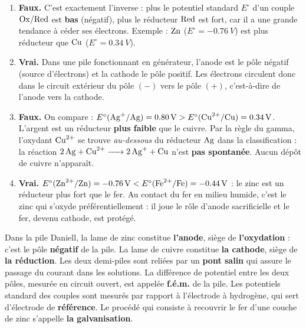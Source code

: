 \documentclass[11pt]{article}
\newcommand{\cle}[1]{{\popxbold\color{popdark}#1}}
\begin{document}
\begin{corrige}
\begin{enumerate}
\item \textbf{Faux.} C'est exactement l'inverse : plus le potentiel standard $E^\circ$ d'un couple $\ce{Ox}/\ce{Red}$ est \textbf{bas} (négatif), plus le réducteur $\ce{Red}$ est fort, car il a une grande tendance à céder ses électrons. Exemple : $\ce{Zn}$ ($E^\circ = \SI{-0,76}{V}$) est plus réducteur que $\ce{Cu}$ ($E^\circ = \SI{+0,34}{V}$).
\item \textbf{Vrai.} Dans une pile fonctionnant en générateur, l'anode est le pôle négatif (source d'électrons) et la cathode le pôle positif. Les électrons circulent donc dans le circuit extérieur du pôle $(-)$ vers le pôle $(+)$, c'est-à-dire de l'anode vers la cathode.
\item \textbf{Faux.} On compare : $E^\circ(\ce{Ag+}/\ce{Ag}) = \SI{+0,80}{V} > E^\circ(\ce{Cu^2+}/\ce{Cu}) = \SI{+0,34}{V}$. L'argent est un réducteur \textbf{plus faible} que le cuivre. Par la règle du gamma, l'oxydant $\ce{Cu^2+}$ se trouve \emph{au-dessous} du réducteur $\ce{Ag}$ dans la classification : la réaction $\ce{2Ag + Cu^2+ -> 2Ag+ + Cu}$ n'est \textbf{pas spontanée}. Aucun dépôt de cuivre n'apparaît.
\item \textbf{Vrai.} $E^\circ(\ce{Zn^2+}/\ce{Zn}) = \SI{-0,76}{V} < E^\circ(\ce{Fe^2+}/\ce{Fe}) = \SI{-0,44}{V}$ : le zinc est un réducteur plus fort que le fer. Au contact du fer en milieu humide, c'est le zinc qui s'oxyde préférentiellement : il joue le rôle d'\cle{anode sacrificielle} et le fer, devenu cathode, est protégé.
\end{enumerate}
\end{corrige}

\begin{corrige}
Dans la pile Daniell, la lame de zinc constitue \textbf{l'anode}, siège de \textbf{l'oxydation} : c'est le pôle \textbf{négatif} de la pile. La lame de cuivre constitue \textbf{la cathode}, siège de \textbf{la réduction}. Les deux demi-piles sont reliées par un \textbf{pont salin} qui assure le passage du courant dans les solutions. La différence de potentiel entre les deux pôles, mesurée en circuit ouvert, est appelée \textbf{f.é.m.} de la pile. Les potentiels standard des couples sont mesurés par rapport à l'électrode à hydrogène, qui sert d'électrode de \textbf{référence}. Le procédé qui consiste à recouvrir le fer d'une couche de zinc s'appelle \textbf{la galvanisation}.
\end{corrige}
\end{document}
